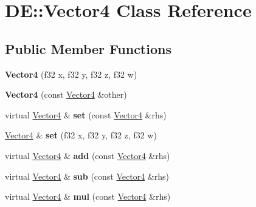 \hypertarget{classDE_1_1Vector4}{}\section{DE\+:\+:Vector4 Class Reference}
\label{classDE_1_1Vector4}
\subsection*{Public Member Functions}
\begin{DoxyCompactItemize}
\item 
{\bfseries Vector4} (f32 x, f32 y, f32 z, f32 w)\hypertarget{classDE_1_1Vector4_a67348a9af53f6c103bcf351db708691c}{}\label{classDE_1_1Vector4_a67348a9af53f6c103bcf351db708691c}

\item 
{\bfseries Vector4} (const \hyperlink{classDE_1_1Vector4}{Vector4} \&other)\hypertarget{classDE_1_1Vector4_a3e499e54e623325cf4b8d52e705c578a}{}\label{classDE_1_1Vector4_a3e499e54e623325cf4b8d52e705c578a}

\item 
virtual \hyperlink{classDE_1_1Vector4}{Vector4} \& {\bfseries set} (const \hyperlink{classDE_1_1Vector4}{Vector4} \&rhs)\hypertarget{classDE_1_1Vector4_ab10e7b46e85a27284f87ee70fa013c9d}{}\label{classDE_1_1Vector4_ab10e7b46e85a27284f87ee70fa013c9d}

\item 
\hyperlink{classDE_1_1Vector4}{Vector4} \& {\bfseries set} (f32 x, f32 y, f32 z, f32 w)\hypertarget{classDE_1_1Vector4_a304205a4d2e265d5207182cee04aa3f0}{}\label{classDE_1_1Vector4_a304205a4d2e265d5207182cee04aa3f0}

\item 
virtual \hyperlink{classDE_1_1Vector4}{Vector4} \& {\bfseries add} (const \hyperlink{classDE_1_1Vector4}{Vector4} \&rhs)\hypertarget{classDE_1_1Vector4_a0e72441f1fda0e83ff1557a1167304dc}{}\label{classDE_1_1Vector4_a0e72441f1fda0e83ff1557a1167304dc}

\item 
virtual \hyperlink{classDE_1_1Vector4}{Vector4} \& {\bfseries sub} (const \hyperlink{classDE_1_1Vector4}{Vector4} \&rhs)\hypertarget{classDE_1_1Vector4_ac220d6deb81942ced7de95cd91298b8d}{}\label{classDE_1_1Vector4_ac220d6deb81942ced7de95cd91298b8d}

\item 
virtual \hyperlink{classDE_1_1Vector4}{Vector4} \& {\bfseries mul} (const \hyperlink{classDE_1_1Vector4}{Vector4} \&rhs)\hypertarget{classDE_1_1Vector4_a2ebf72404f1e7d1d774d962fb39eb339}{}\label{classDE_1_1Vector4_a2ebf72404f1e7d1d774d962fb39eb339}


\end{DoxyCompactItemize}
